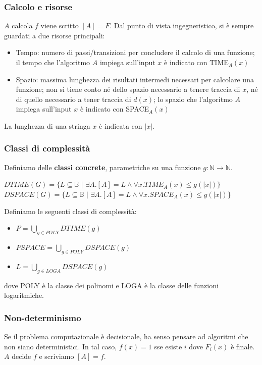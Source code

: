 \documentclass{article}
\begin{document}
\subsubsection{Calcolo e risorse}
$A$ calcola $f$ viene scritto $[A] = F$. Dal punto di vista ingegneristico, si è sempre guardati a due risorse principali:
\begin{itemize}
    \item Tempo: numero di passi/transizioni per concludere il calcolo di una funzione; il tempo che l'algoritmo $A$ impiega sull'input $x$ è indicato con TIME$_A(x)$
    \item Spazio: massima lunghezza dei risultati intermedi necessari per calcolare una funzione; non si tiene conto né dello spazio necessario a tenere traccia di $x$, né di quello necessario a tener traccia di $d(x)$; lo spazio che l'algoritmo $A$ impiega sull'input $x$ è indicato con SPACE$_A(x)$
\end{itemize}
La lunghezza di una stringa $x$ è indicata con $|x|$.

\subsubsection{Classi di complessità}
Definiamo delle \textbf{classi concrete}, parametriche su una funzione $g:\mathbb{N}\to\mathbb{N}$.

\bigskip

\noindent$DTIME(G)=\{L\subseteq\mathbb{B}\,\,|\,\,\exists A.[A]=L\land\forall x.TIME_A(x)\leq g(|x|)\}$
\\
$DSPACE(G)=\{L\subseteq\mathbb{B}\,\,|\,\,\exists A.[A]=L\land\forall x.SPACE_A(x)\leq g(|x|)\}$

\bigskip

Definiamo le seguenti classi di complessità:
\begin{itemize}
    \item $P=\bigcup_{g\in POLY}^{} DTIME(g)$
    \item $PSPACE=\bigcup_{g\in POLY}^{} DSPACE(g)$
    \item $L=\bigcup_{g\in LOGA}^{} DSPACE(g)$
\end{itemize}
dove POLY è la classe dei polinomi e LOGA è la classe delle funzioni logaritmiche.

\subsubsection{Non-determinismo}
Se il problema computazionale è decisionale, ha senso pensare ad algoritmi che non siano deterministici. In tal caso, $f(x) = 1$ sse esiste $i$ dove $F_i(x)$ è finale. $A$ decide $f$ e scriviamo $[A]=f$.
\end{document}
